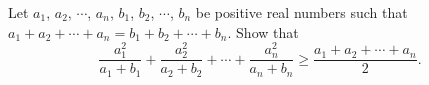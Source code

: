 Let $a_1$, $a_2$, $\cdots$, $a_n$, $b_1$, $b_2$, $\cdots$, $b_n$ be positive real numbers such that $a_1 + a_2 + \cdots + a_n = b_1 + b_2 + \cdots + b_n$. Show that 
\[ \frac{a_1^2}{a_1 + b_1} + \frac{a_2^2}{a_2 + b_2} + \cdots + \frac{a_n^2}{a_n + b_n} \geq \frac{a_1 + a_2 + \cdots + a_n}{2}. \]